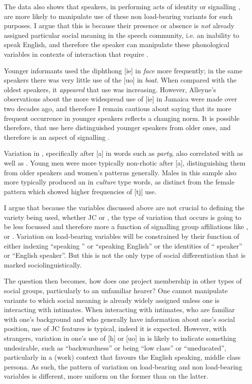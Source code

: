 The data also shows that speakers, in performing acts of identity or signalling , are more likely to manipulate use of these non load-bearing  variants for such purposes.  I argue that this is because their presence or absence is \textit{not} already assigned particular social meaning in the speech community, i.e. an inability to speak English, and therefore the speaker can manipulate these phonological variables in contexts of interaction that require .  

Younger informants used the diphthong [ie] in \textit{face} more frequently; in the same speakers there was very little use of the  [uo] in \textit{boat}.  When compared with the oldest speakers, it \textit{appeared} that  use was increasing.  However, Alleyne’s observations about the more widespread use of [ie] in Jamaica were made over two decades ago, and therefore I remain cautious about saying that its more frequent occurrence in younger speakers reflects a changing norm.  It is possible therefore, that  use here distinguished younger speakers from older ones, and therefore is an aspect of signalling .  

Variation in , specifically after [a] in words such as \textit{party}, also correlated with  as well as .  Young men were more typically non-rhotic after [a], distinguishing them from older speakers and women’s patterns generally.  Males in this sample also more typically produced an  in \textit{culture} type words, as distinct from the female pattern which showed higher frequencies of [tj] use.\largerpage[-1]

I argue that because the variables discussed above are not crucial to defining the variety being used, whether JC or , the type of variation that occurs is going to be less focussed and therefore more a function of signalling group affiliations like , or .  Variation on load-bearing variables will be constrained by their function of either indexing “speaking ” or “speaking English” or the identities of “ speaker” or “English speaker”.  But this is not the only type of social differentiation that is marked sociolinguistically.  

The question then becomes, how does one project membership in other types of social groups, particularly to an unfamiliar hearer?  One cannot manipulate variants to which social meaning is already widely assigned unless one is interacting with intimates.  When interacting with intimates, who are familiar with one’s background and who generally have information about one’s social position, use of JC features is typical, indeed it is expected.  However, with strangers, variation in one’s use of [h] or [uo] in  is likely to indicate something undesirable, such as “backwardness” or being “low class” or “uneducated”, particularly in a (work) context that favours the English speaking, middle class persona.  As such, the pattern of variation on load-bearing and non load-bearing variables is different, more uniform on the former than on the latter.

